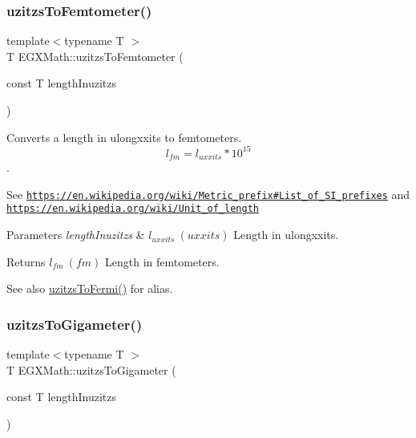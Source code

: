 \subsubsection{\texorpdfstring{uzitzs\+To\+Femtometer()}{uzitzsToFemtometer()}}
{\footnotesize\ttfamily template$<$typename T $>$ \\
T E\+G\+X\+Math\+::uzitzs\+To\+Femtometer (\begin{DoxyParamCaption}\item[{const T}]{length\+Inuzitzs }\end{DoxyParamCaption})}



Converts a length in ulongxxits to femtometers. \[ l_{fm}=l_{uxxits} * 10^{15} \]. 

See \href{https://en.wikipedia.org/wiki/Metric_prefix#List_of_SI_prefixes}{\tt https\+://en.\+wikipedia.\+org/wiki/\+Metric\+\_\+prefix\#\+List\+\_\+of\+\_\+\+S\+I\+\_\+prefixes} and \href{https://en.wikipedia.org/wiki/Unit_of_length}{\tt https\+://en.\+wikipedia.\+org/wiki/\+Unit\+\_\+of\+\_\+length} 
\begin{DoxyParams}{Parameters}
{\em length\+Inuzitzs} & $ l_{uxxits}\ (uxxits)$ Length in ulongxxits. \\
\hline
\end{DoxyParams}
\begin{DoxyReturn}{Returns}
$ l_{fm}\ (fm)$ Length in femtometers. 
\end{DoxyReturn}
\begin{DoxySeeAlso}{See also}
\mbox{\hyperlink{group___e_g_x_math-_conversions-_length_conversions-uzitzs-_non-_s_i_ga920cd8aae6bc9f70faa49a6a5c988040}{uzitzs\+To\+Fermi()}} for alias. 
\end{DoxySeeAlso}
\mbox{\label{group___e_g_x_math-_conversions-_length_conversions-uzitzs-_s_i_ga15833fbe62cb7d741b808bc63a21df55}} 
\subsubsection{\texorpdfstring{uzitzs\+To\+Gigameter()}{uzitzsToGigameter()}}
{\footnotesize\ttfamily template$<$typename T $>$ \\
T E\+G\+X\+Math\+::uzitzs\+To\+Gigameter (\begin{DoxyParamCaption}\item[{const T}]{length\+Inuzitzs }\end{DoxyParamCaption})}



